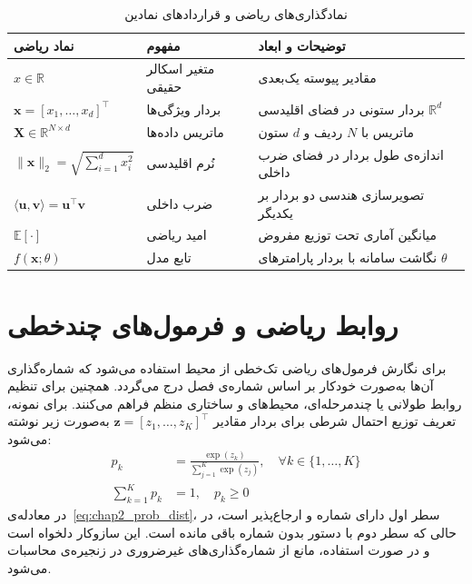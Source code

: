 \begin{table}[!ht]
    \centering
    \small
    \setlength{\aboverulesep}{0pt}
    \setlength{\belowrulesep}{0pt}
    \caption{نمادگذاری‌های ریاضی و قراردادهای نمادین}\label{tab:chap2_notations}
    \vspace{0.2cm}
    \begin{tabularx}{\textwidth}{l p{4.5cm} X}
        \toprule
        \textbf{نماد ریاضی} & \textbf{مفهوم} & \textbf{توضیحات و ابعاد} \\
        \midrule
        $x \in \mathbb{R}$ & متغیر اسکالر حقیقی & مقادیر پیوسته یک‌بعدی \\
        $\mathbf{x} = {[x_1, \dots, x_d]}^\top$ & بردار ویژگی‌ها & بردار ستونی در فضای اقلیدسی $\mathbb{R}^d$ \\
        $\mathbf{X} \in \mathbb{R}^{N \times d}$ & ماتریس داده‌ها & ماتریس با $N$ ردیف و $d$ ستون \\
        $\|\mathbf{x}\|_2 = \sqrt{\sum_{i=1}^d x_i^2}$ & نُرم اقلیدسی & اندازه‌ی طول بردار در فضای ضرب داخلی \\
        $\langle \mathbf{u}, \mathbf{v} \rangle = \mathbf{u}^\top \mathbf{v}$ & ضرب داخلی & تصویرسازی هندسی دو بردار بر یکدیگر \\
        $\mathbb{E}[\cdot]$ & امید ریاضی & میانگین آماری تحت توزیع مفروض \\
        $f(\mathbf{x}; \theta)$ & تابع مدل & نگاشت سامانه با بردار پارامترهای $\theta$ \\
        \bottomrule
    \end{tabularx}\vspace{0.5cm}
\end{table}


\section{روابط ریاضی و فرمول‌های چندخطی}\label{sec:2-2}

برای نگارش فرمول‌های ریاضی تک‌خطی از محیط  استفاده می‌شود که شماره‌گذاری آن‌ها به‌صورت خودکار بر اساس شماره‌ی فصل درج می‌گردد. همچنین برای تنظیم روابط طولانی یا چندمرحله‌ای، محیط‌های  و  ساختاری منظم فراهم می‌کنند. برای نمونه، تعریف توزیع احتمال شرطی برای بردار مقادیر $\mathbf{z} = {[z_1, \dots, z_K]}^\top$ به‌صورت زیر نوشته می‌شود:
\begin{align}
    p_k &= \frac{\exp(z_k)}{\sum_{j=1}^K \exp(z_j)}, \quad \forall k \in \{1, \dots, K\} \label{eq:chap2_prob_dist} \\
    \sum_{k=1}^K p_k &= 1, \quad p_k \ge 0 \nonumber
\end{align}
در معادله‌ی~\eqref{eq:chap2_prob_dist}، سطر اول دارای شماره و ارجاع‌پذیر است، در حالی که سطر دوم با دستور  بدون شماره باقی مانده است. این سازوکار دلخواه است و در صورت استفاده، مانع از شماره‌گذاری‌های غیرضروری در زنجیره‌ی محاسبات می‌شود.



